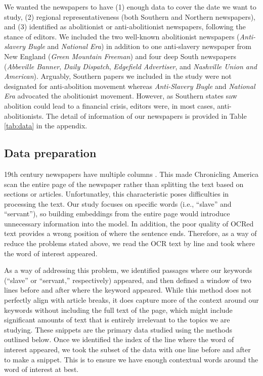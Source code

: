 \documentclass[11pt]{article}
\begin{document}
We wanted the newspapers to have (1) enough data to cover the date we want to study, (2) regional representativeness (both Southern and Northern newspapers), and (3) identified as abolitionist or anti-abolitionist newspapers, following the stance of editors.  
We included the two well-known abolitionist newspapers (\textit{Anti-slavery Bugle} and \textit{National Era}) in addition to one anti-slavery newspaper from New England (\textit{Green Mountain Freeman}) and four deep South newspapers (\textit{Abbeville Banner}, \textit{Daily Dispatch}, \textit{Edgefield Advertiser}, and \textit{Nashville Union and American}). 
Arguably, Southern papers we included in the study were not designated for anti-abolition movement whereas \textit{Anti-Slavery Bugle} and \textit{National Era} advocated the abolitionist movement. 
However, as Southern states saw abolition could lead to a financial crisis, editors were, in most cases, anti-abolitionists. 
The detail of information of our newspapers is provided in Table \ref{tab:data} in the appendix.

\subsection{Data preparation} \label{data preparation}
19th century newspapers have multiple columns \citep{smith_computational_2015}.
This made Chronicling America scan the entire page of the newspaper rather than splitting the text based on sections or articles. 
Unfortunatley, this characteristic poses difficulties in processing the text. 
Our study focuses on specific words (i.e., ``slave'' and ``servant''),
so building embeddings from the entire page would introduce unnecessary information into the model.
In addition, the poor quality of OCRed text provides a wrong position of where the sentence ends. Therefore, as a way of reduce the problems stated above, we read the OCR text by line and took where the word of interest appeared.

As a way of addressing this problem, we identified passages where our keywords (``slave'' or ``servant,'' respectively) appeared, and then defined a window of two lines before and after where the keyword appeared. 
While this method does not perfectly align with article breaks, it does capture more of the context around our keywords without including the full text of the page, which might include significant amounts of text that is entirely irrelevant to the topics we are studying. 
These snippets are the primary data studied using the methods outlined below. 
Once we identified the index of the line where the word of interest appeared, we took the subset of the data with one line before and after to make a snippet. 
This is to ensure we have enough contextual words around the word of interest at best. 
\end{document}
